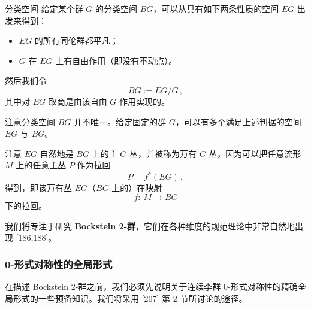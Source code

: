 
\begin{notebox}{分类空间}
给定某个群 $G$ 的分类空间 $BG$，可以从具有如下两条性质的空间 $EG$ 出发来得到：
\begin{itemize}[leftmargin=1.4em,itemsep=1pt,topsep=1pt]
\item $EG$ 的所有同伦群都平凡；
\item $G$ 在 $EG$ 上有自由作用（即没有不动点）。
\end{itemize}

然后我们令
\begin{equation}
  BG:=EG/G\,, \tag{5.37}
\end{equation}
其中对 $EG$ 取商是由该自由 $G$ 作用实现的。

注意分类空间 $BG$ 并不唯一。给定固定的群 $G$，可以有多个满足上述判据的空间 $EG$ 与 $BG$。

注意 $EG$ 自然地是 $BG$ 上的主 $G$-丛，并被称为万有 $G$-丛，因为可以把任意流形 $M$ 上的任意主丛 $P$ 作为拉回
\begin{equation}
  P=f^*(EG)\,, \tag{5.38}
\end{equation}
得到，即该万有丛 $EG$（$BG$ 上的）在映射
\begin{equation}
  f:\ M\to BG \tag{5.39}
\end{equation}
下的拉回。
\end{notebox}


我们将专注于研究 \textbf{Bockstein 2-群}，它们在各种维度的规范理论中非常自然地出现 [186,188]。

\subsubsection{0-形式对称性的全局形式}

在描述 Bockstein 2-群之前，我们必须先说明关于连续李群 0-形式对称性的精确全局形式的一些预备知识。我们将采用 [207] 第 2 节所讨论的途径。

